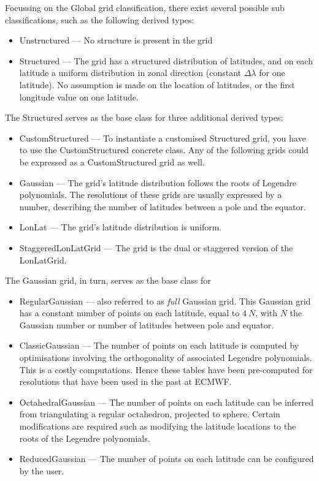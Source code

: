 %
Focussing on the Global grid classification, there exist several
possible sub classifications, such as the following derived types: 
\begin{itemize}
  \setlength\itemsep{0.4em}
  \item Unstructured --- No structure is present in the grid
  \item Structured --- The grid has a structured distribution of latitudes, and on each latitude a uniform distribution in zonal direction (constant $\Delta\lambda$ for one latitude). No assumption is made on the location of latitudes, or the first longitude value on one latitude.
\end{itemize}
The Structured serves as the base class for three additional derived types:
\begin{itemize}
  \setlength\itemsep{0.4em}
  \item CustomStructured --- To instantiate a customised Structured grid,
        you have to use the CustomStructured concrete class. Any of the
        following grids could be expressed as a CustomStructured grid as well.
  \item Gaussian --- The grid's latitude distribution follows the
        roots of Legendre polynomials. The resolutions of these grids are
        usually expressed by a number, describing the number of latitudes
        between a pole and the equator.
  \item LonLat --- The grid's latitude distribution is uniform.
  \item StaggeredLonLatGrid --- The grid is the dual or staggered version of
        the LonLatGrid.
\end{itemize}
The Gaussian grid, in turn, serves as the base class for 
\begin{itemize}
  \item RegularGaussian --- also referred to as \emph{full} Gaussian grid.
        This Gaussian grid has a constant number of points on each latitude, 
        equal to $4\ N$, with $N$ the Gaussian number or number of latitudes
        between pole and equator.
  \item ClassicGaussian --- The number of points on each latitude is computed
        by optimisations involving the orthogonality of associated Legendre
        polynomials. This is a costly computations. Hence these tables have been
        pre-computed for resolutions that have been used in the past at ECMWF.
  \item OctahedralGaussian --- The number of points on each latitude
        can be inferred from triangulating a regular octahedron, projected to
        sphere. Certain modifications are required such as modifying the
        latitude locations to the roots of the Legendre polynomials.
  \item ReducedGaussian --- The number of points on each latitude can be 
        configured by the user.
\end{itemize}
